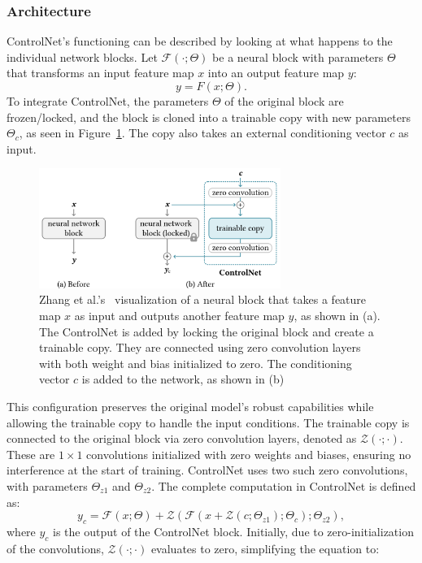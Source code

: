 \subsubsection{Architecture}
ControlNet's functioning can be described by looking at what happens to the individual network blocks. Let $\mathcal{F}(\cdot; \Theta)$ be a neural block with parameters $\Theta$ that transforms an input feature map $x$ into an output feature map $y$:
\[
    y = F(x; \Theta).
\]
To integrate ControlNet, the parameters $\Theta$ of the original block are frozen/locked, and the block is cloned into a trainable copy with new parameters $\Theta_c$, as seen in Figure~\ref{fig:control_net:network_blocks}. The copy also takes an external conditioning vector $c$ as input.
\begin{figure}[h!]
    \centering
    \includegraphics[width=0.7\textwidth]{assets/control_net_network_blocks.pdf}
    \caption{Zhang et al.'s~\cite{zhang2023addingconditionalcontroltexttoimage} visualization of a neural block that takes a feature map $x$ as input and outputs another feature map $y$, as shown in (a). The ControlNet is added by locking the original block and create a trainable copy. They are connected using zero convolution layers with both weight and bias initialized to zero. The conditioning vector $c$ is added to the network, as shown in (b)}
    \label{fig:control_net:network_blocks}
\end{figure}
This configuration preserves the original model's robust capabilities while allowing the trainable copy to handle the input conditions. The trainable copy is connected to the original block via zero convolution layers, denoted as $\mathcal Z(\cdot; \cdot)$. These are $1 \times 1$ convolutions initialized with zero weights and biases, ensuring no interference at the start of training. ControlNet uses two such zero convolutions, with parameters $\Theta_{z1}$ and $\Theta_{z2}$. The complete computation in ControlNet is defined as:
\[
    y_c = \mathcal{F}(x; \Theta) + \mathcal{Z}(\mathcal{F}(x + \mathcal{Z}(c; \Theta_{z1}); \Theta_c); \Theta_{z2}),
\]
where $y_c$ is the output of the ControlNet block. Initially, due to zero-initialization of the convolutions, $\mathcal{Z}(\cdot; \cdot)$ evaluates to zero, simplifying the equation to:
